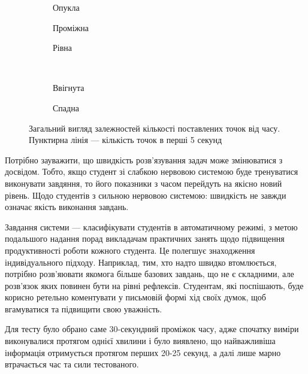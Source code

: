 \begin{figure}[h]
  \centering
  \begin{subfigure}[b]{0.3\textwidth}
                \caption{Опукла}
                \label{fig:tapping:movable}
  \end{subfigure}
  \begin{subfigure}[b]{0.3\textwidth}
                \caption{Проміжна}
                \label{fig:tapping:middle}
  \end{subfigure}
  \begin{subfigure}[b]{0.3\textwidth}
                \caption{Рівна}
                \label{fig:tapping:flat}
  \end{subfigure}\\[2ex]
  \begin{subfigure}[b]{0.3\textwidth}
                \caption{Ввігнута}
                \label{fig:tapping:concave}
  \end{subfigure}
  \begin{subfigure}[b]{0.3\textwidth}
                \caption{Спадна}
                \label{fig:tapping:weak}
  \end{subfigure}
  \caption{Загальний вигляд залежностей кількості поставлених точок від часу.
  Пунктирна лінія --- кількість точок в перші 5 секунд}
  \label{fig:studentBehaviorSimple}
\end{figure}

Потрібно зауважити, що швидкість розв’язування задач може змінюватися з
досвідом.
Тобто, якщо студент зі слабкою нервовою системою буде тренуватися виконувати
завдяння, то його показники з часом перейдуть на якісно новий рівень.
Щодо студентів з сильною нервовою системою: швидкість не завжди означає якість
виконання завдань.

Завдання системи --- класифікувати студентів в автоматичному режимі,
з метою подальшого надання порад викладачам практичних занять щодо підвищення
продуктивності роботи кожного студента.
Це полегшує знаходження індивідуального підходу.
Наприклад, тим, хто надто швидко втомлюється, потрібно розв’яювати якомога
більше базових завдань, що не є складними, але розв’язок яких повинен бути
на рівні рефлексів.
Студентам, які поспішають, буде корисно ретельно коментувати у письмовій
формі хід своїх думок, щоб вгамуватися та підвищити свою уважність.

Для тесту було обрано саме 30-секундний проміжок часу, адже спочатку
виміри виконувалися протягом однієї хвилини і було виявлено, що найважливіша
інформація отримується протягом перших 20-25 секунд, а далі лише марно
втрачається час та сили тестованого. \cite{Ilin:2001}

